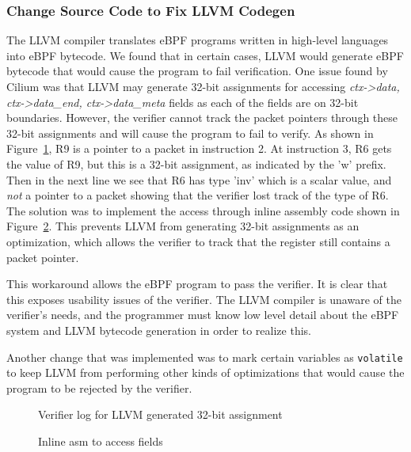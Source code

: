 \subsubsection{Change Source Code to Fix LLVM Codegen}
The LLVM compiler translates eBPF programs written in high-level languages into eBPF bytecode.
We found that in certain cases, LLVM would generate eBPF bytecode that would cause the program to fail verification.
One issue found by Cilium was that LLVM may generate 32-bit assignments for 
    accessing \emph{ctx->data, ctx->data\_end, ctx->data\_meta} fields as 
    each of the fields are on 32-bit boundaries.
However, the verifier cannot track the packet pointers through these 32-bit assignments and
    will cause the program to fail to verify.
As shown in Figure~\ref{fig:inline-error}, R9 is a pointer to a packet in instruction 2.
At instruction 3, R6 gets the value of R9, but this is a 32-bit assignment, as indicated by the 'w' prefix.
Then in the next line we see that R6 has type 'inv' which is a scalar value, and \emph{not} a pointer to a packet showing that the verifier lost track of the type of R6.
The solution was to implement the access through inline assembly code shown in Figure~\ref{fig:inline-asm}.
This prevents LLVM from generating 32-bit assignments as an optimization, which allows the verifier to track that the register still contains a packet pointer.



This workaround allows the eBPF program to pass the verifier.
It is clear that this exposes usability issues of the verifier.
The LLVM compiler is unaware of the verifier's needs, and the programmer must know low level detail about the eBPF system and LLVM bytecode generation in order to realize this.

Another change that was implemented was to mark certain variables as \texttt{volatile}
to keep LLVM from performing other kinds of optimizations that would cause the program to be rejected by the verifier.

\begin{figure}
    
    \caption{Verifier log for LLVM generated 32-bit assignment}
    \label{fig:inline-error}
\end{figure}

\begin{figure}
    
    \caption{Inline asm to access fields}
    \label{fig:inline-asm}
\end{figure}


